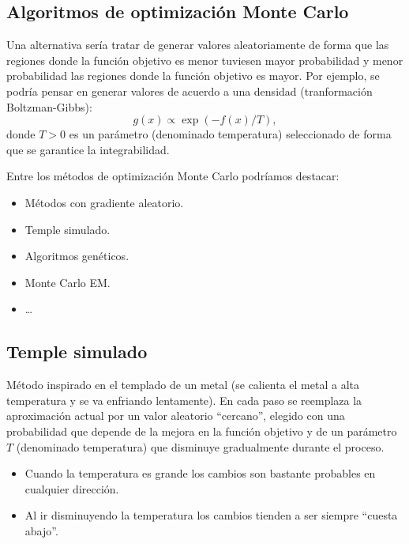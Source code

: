 \documentclass[
]{book}
\theoremstyle{break}
\theoremstyle{nonumberplain}
\begin{document}
\hypertarget{algoritmos-de-optimizaciuxf3n-monte-carlo}{%
\subsection{Algoritmos de optimización Monte Carlo}\label{algoritmos-de-optimizaciuxf3n-monte-carlo}}

Una alternativa sería tratar de generar valores aleatoriamente de forma que las regiones donde la función objetivo es menor tuviesen mayor probabilidad y menor probabilidad las regiones donde la función objetivo es mayor.
Por ejemplo, se podría pensar en generar valores de acuerdo a una densidad (tranformación Boltzman-Gibbs):
\[g(x)\propto \exp \left( -f(x)/T\right) ,\]
donde \(T>0\) es un parámetro (denominado temperatura) seleccionado de forma que se garantice la integrabilidad.

Entre los métodos de optimización Monte Carlo podríamos destacar:

\begin{itemize}
\item
  Métodos con gradiente aleatorio.
\item
  Temple simulado.
\item
  Algoritmos genéticos.
\item
  Monte Carlo EM.
\item
  \ldots{}
\end{itemize}

\hypertarget{temple-simulado}{%
\subsection{Temple simulado}\label{temple-simulado}}

Método inspirado en el templado de un metal (se calienta el metal a alta temperatura y se va enfriando lentamente).
En cada paso se reemplaza la aproximación actual por un valor aleatorio ``cercano'', elegido con una probabilidad que depende de la mejora en la función objetivo y de un parámetro \(T\) (denominado temperatura) que disminuye gradualmente durante el proceso.

\begin{itemize}
\item
  Cuando la temperatura es grande los cambios son bastante
  probables en cualquier dirección.
\item
  Al ir disminuyendo la temperatura los cambios tienden a ser
  siempre ``cuesta abajo''.
\end{itemize}
\end{document}
